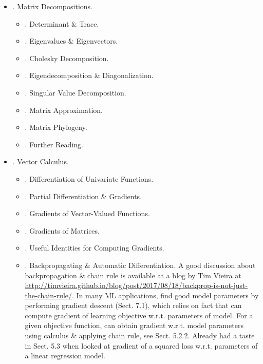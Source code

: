 \documentclass{article}
\begin{document}
\begin{enumerate}
\begin{itemize}
\begin{itemize}
		\end{itemize}
		\item {. Matrix Decompositions.}
		\begin{itemize}
			\item {. Determinant \& Trace.}
			\item {. Eigenvalues \& Eigenvectors.}
			\item {. Cholesky Decomposition.}
			\item {. Eigendecomposition \& Diagonalization.}
			\item {. Singular Value Decomposition.}
			\item {. Matrix Approximation.}
			\item {. Matrix Phylogeny.}
			\item {. Further Reading.}
		\end{itemize}
		\item {. Vector Calculus.}
		\begin{itemize}
			\item {. Differentiation of Univariate Functions.}
			\item {. Partial Differentiation \& Gradients.}
			\item {. Gradients of Vector-Valued Functions.}
			\item {. Gradients of Matrices.}
			\item {. Useful Identities for Computing Gradients.}
			\item {. Backpropagating \& Automatic Differentiation.} A good discussion about backpropagation \& chain rule is available at a blog by {\sc Tim Vieira} at \url{http://timvieira.github.io/blog/post/2017/08/18/backprop-is-not-just-the-chain-rule/}. In many ML applications, find good model parameters by performing gradient descent (Sect. 7.1), which relies on fact that can compute gradient of learning objective w.r.t. parameters of model. For a given objective function, can obtain gradient w.r.t. model parameters using calculus \& applying chain rule, see Sect. 5.2.2. Already had a taste in Sect. 5.3 when looked at gradient of a squared loss w.r.t. parameters of a linear regression model.
			

\end{itemize}
\end{itemize}
\end{enumerate}
\end{document}

